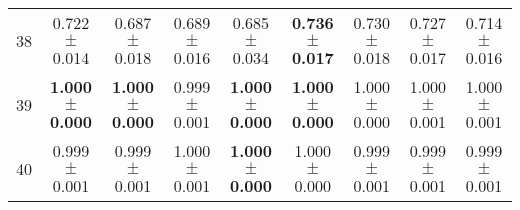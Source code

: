 \begin{table}[!ht]
{\begin{tabular}{r c c c c c c c c}
38 & 0.722 $\pm$ 0.014 & 0.687 $\pm$ 0.018 & 0.689 $\pm$ 0.016 & 0.685 $\pm$ 0.034 & \textbf{0.736 $\pm$ 0.017} & 0.730 $\pm$ 0.018 & 0.727 $\pm$ 0.017 & 0.714 $\pm$ 0.016 \\
39 & \textbf{1.000 $\pm$ 0.000} & \textbf{1.000 $\pm$ 0.000} & 0.999 $\pm$ 0.001 & \textbf{1.000 $\pm$ 0.000} & \textbf{1.000 $\pm$ 0.000} & 1.000 $\pm$ 0.000 & 1.000 $\pm$ 0.001 & 1.000 $\pm$ 0.001 \\
40 & 0.999 $\pm$ 0.001 & 0.999 $\pm$ 0.001 & 1.000 $\pm$ 0.001 & \textbf{1.000 $\pm$ 0.000} & 1.000 $\pm$ 0.000 & 0.999 $\pm$ 0.001 & 0.999 $\pm$ 0.001 & 0.999 $\pm$ 0.001 \\
\end{tabular}}
\end{table}
